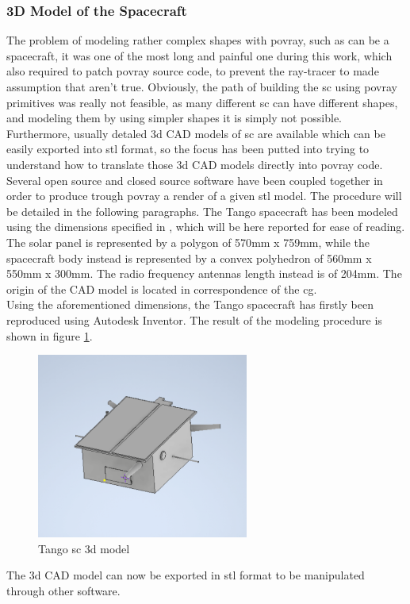 \subsubsection{3D Model of the Spacecraft}
The problem of modeling rather complex shapes with \acrshort{povray}, such as can be a spacecraft, it was one of the most long and painful one during this work, which also required to patch \acrshort{povray} source code, to prevent the ray-tracer to made assumption that aren't true. Obviously, the path of building the \acrshort{sc} using \acrshort{povray} primitives was really not feasible, as many different \acrshort{sc} can have different shapes, and modeling them by using simpler shapes it is simply not possible. Furthermore, usually detaled \acrshort{3d} CAD models of \acrshort{sc} are available which can be easily exported into \acrshort{stl} format, so the focus has been putted into trying to understand how to translate those \acrshort{3d} CAD models directly into \acrshort{povray} code.
Several open source and closed source software have been coupled together in order to produce trough \acrshort{povray} a render of a given \acrshort{stl} model.
The procedure will be detailed in the following paragraphs.
The Tango spacecraft has been modeled using the dimensions specified in \cite{Sharma2018}, which will be here reported for ease of reading. The solar panel is represented by a polygon of \si{570}{mm} x \si{759}{mm}, while the spacecraft body instead is represented by a convex polyhedron of \si{560}{mm} x \si{550}{mm} x \si{300}{mm}. The radio frequency antennas length instead is of \si{204}{mm}. The origin of the CAD model is located in correspondence of the \acrshort{cg}.\\
Using the aforementioned dimensions, the Tango spacecraft has firstly been reproduced using Autodesk Inventor. The result of the modeling procedure is shown in figure \ref{fig:tango3d}.

\begin{figure}
  \centering
  \includegraphics[width=0.62\textwidth]{gfx/tangoScreenshot2.eps}
  \caption{Tango \acrshort{sc} \acrshort{3d} model}
  \label{fig:tango3d}
\end{figure}
The \acrshort{3d} CAD model can now be exported in \acrshort{stl} format to be manipulated through other software.

